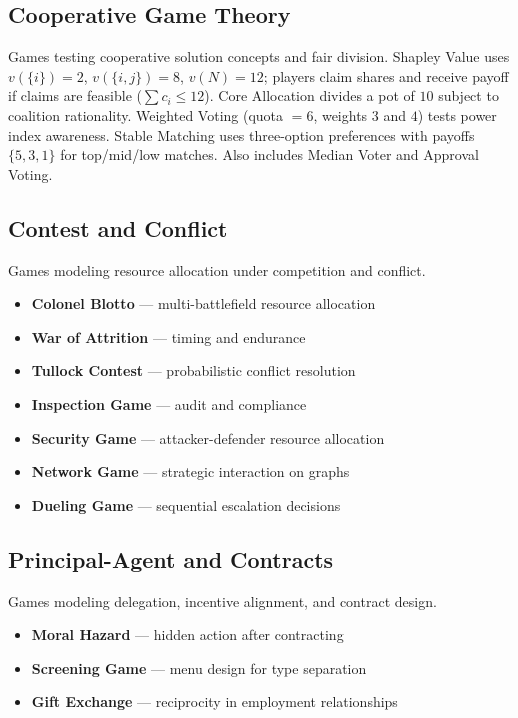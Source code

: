 \subsection{Cooperative Game Theory}
\label{sec:cooperative}

Games testing cooperative solution concepts and fair division.
Shapley Value uses $v(\{i\}) = 2$, $v(\{i,j\}) = 8$, $v(N) = 12$; players
claim shares and receive payoff if claims are feasible ($\sum c_i \leq 12$).
Core Allocation divides a pot of $10$ subject to coalition rationality.
Weighted Voting (quota $= 6$, weights $3$ and $4$) tests power index
awareness. Stable Matching uses three-option preferences with payoffs
$\{5, 3, 1\}$ for top/mid/low matches. Also includes Median Voter and
Approval Voting.

\subsection{Contest and Conflict}
\label{sec:contest}

Games modeling resource allocation under competition and conflict.

\begin{itemize}[nosep]
    \item \textbf{Colonel Blotto} --- multi-battlefield resource allocation
    \item \textbf{War of Attrition} --- timing and endurance
    \item \textbf{Tullock Contest} --- probabilistic conflict resolution
    \item \textbf{Inspection Game} --- audit and compliance
    \item \textbf{Security Game} --- attacker-defender resource allocation
    \item \textbf{Network Game} --- strategic interaction on graphs
    \item \textbf{Dueling Game} --- sequential escalation decisions
\end{itemize}


\subsection{Principal-Agent and Contracts}
\label{sec:principal-agent}

Games modeling delegation, incentive alignment, and contract design.

\begin{itemize}[nosep]
    \item \textbf{Moral Hazard} --- hidden action after contracting
    \item \textbf{Screening Game} --- menu design for type separation
    \item \textbf{Gift Exchange} --- reciprocity in employment relationships
\end{itemize}


